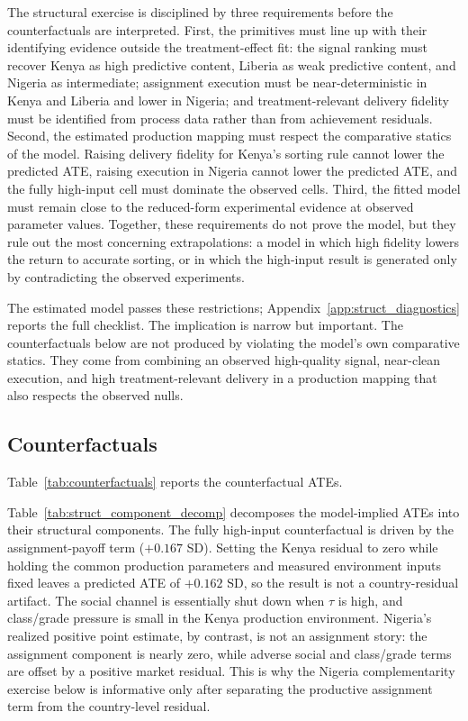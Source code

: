 \documentclass[11pt]{article}
\begin{document}
The structural exercise is disciplined by three requirements before the counterfactuals are interpreted. First, the primitives must line up with their identifying evidence outside the treatment-effect fit: the signal ranking must recover Kenya as high predictive content, Liberia as weak predictive content, and Nigeria as intermediate; assignment execution must be near-deterministic in Kenya and Liberia and lower in Nigeria; and treatment-relevant delivery fidelity must be identified from process data rather than from achievement residuals. Second, the estimated production mapping must respect the comparative statics of the model. Raising delivery fidelity for Kenya's sorting rule cannot lower the predicted ATE, raising execution in Nigeria cannot lower the predicted ATE, and the fully high-input cell must dominate the observed cells. Third, the fitted model must remain close to the reduced-form experimental evidence at observed parameter values. Together, these requirements do not prove the model, but they rule out the most concerning extrapolations: a model in which high fidelity lowers the return to accurate sorting, or in which the high-input result is generated only by contradicting the observed experiments.

The estimated model passes these restrictions; Appendix~\ref{app:struct_diagnostics} reports the full checklist. The implication is narrow but important. The counterfactuals below are not produced by violating the model's own comparative statics. They come from combining an observed high-quality signal, near-clean execution, and high treatment-relevant delivery in a production mapping that also respects the observed nulls.

\subsection{Counterfactuals}
\label{subsec:struct_counterfactuals}

Table~\ref{tab:counterfactuals} reports the counterfactual ATEs.



Table~\ref{tab:struct_component_decomp} decomposes the model-implied ATEs into their structural components. The fully high-input counterfactual is driven by the assignment-payoff term ($+0.167$ SD). Setting the Kenya residual to zero while holding the common production parameters and measured environment inputs fixed leaves a predicted ATE of $+0.162$ SD, so the result is not a country-residual artifact. The social channel is essentially shut down when $\tau$ is high, and class/grade pressure is small in the Kenya production environment. Nigeria's realized positive point estimate, by contrast, is not an assignment story: the assignment component is nearly zero, while adverse social and class/grade terms are offset by a positive market residual. This is why the Nigeria complementarity exercise below is informative only after separating the productive assignment term from the country-level residual.
\end{document}
